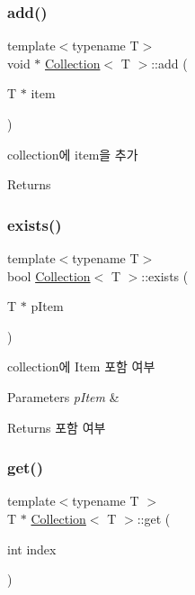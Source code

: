 \subsubsection{\texorpdfstring{add()}{add()}}
{\footnotesize\ttfamily template$<$typename T$>$ \\
void $\ast$ \mbox{\hyperlink{class_collection}{Collection}}$<$ T $>$\+::add (\begin{DoxyParamCaption}\item[{T $\ast$}]{item }\end{DoxyParamCaption})}

collection에 item을 추가 \begin{DoxyReturn}{Returns}

\end{DoxyReturn}
\mbox{\label{class_collection_a7c44d6d2aad8c98fbfe597646d7fd4ff}} 
\subsubsection{\texorpdfstring{exists()}{exists()}}
{\footnotesize\ttfamily template$<$typename T$>$ \\
bool \mbox{\hyperlink{class_collection}{Collection}}$<$ T $>$\+::exists (\begin{DoxyParamCaption}\item[{T $\ast$}]{p\+Item }\end{DoxyParamCaption})}

collection에 Item 포함 여부 
\begin{DoxyParams}{Parameters}
{\em p\+Item} & \\
\hline
\end{DoxyParams}
\begin{DoxyReturn}{Returns}
포함 여부 
\end{DoxyReturn}
\mbox{\label{class_collection_a64cd1dc1f2099f0baa1e8ddb0efdd470}} 
\subsubsection{\texorpdfstring{get()}{get()}}
{\footnotesize\ttfamily template$<$typename T $>$ \\
T $\ast$ \mbox{\hyperlink{class_collection}{Collection}}$<$ T $>$\+::get (\begin{DoxyParamCaption}\item[{int}]{index }\end{DoxyParamCaption})}

